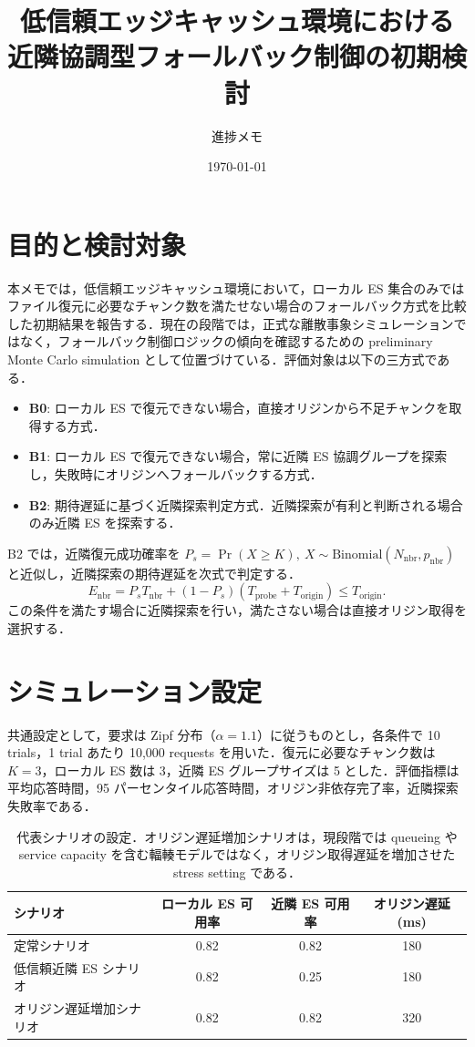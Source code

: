 \documentclass[paper=a4,fontsize=9pt]{jlreq}
\title{\vspace{-1.4em}低信頼エッジキャッシュ環境における\\近隣協調型フォールバック制御の初期検討}
\author{進捗メモ}
\date{\today}
\begin{document}
\maketitle
\vspace{-2.5em}

\section{目的と検討対象}
本メモでは，低信頼エッジキャッシュ環境において，ローカル ES 集合のみではファイル復元に必要なチャンク数を満たせない場合のフォールバック方式を比較した初期結果を報告する．現在の段階では，正式な離散事象シミュレーションではなく，フォールバック制御ロジックの傾向を確認するための preliminary Monte Carlo simulation として位置づけている．評価対象は以下の三方式である．

\begin{itemize}
  \item \textbf{B0}: ローカル ES で復元できない場合，直接オリジンから不足チャンクを取得する方式．
  \item \textbf{B1}: ローカル ES で復元できない場合，常に近隣 ES 協調グループを探索し，失敗時にオリジンへフォールバックする方式．
  \item \textbf{B2}: 期待遅延に基づく近隣探索判定方式．近隣探索が有利と判断される場合のみ近隣 ES を探索する．
\end{itemize}

B2 では，近隣復元成功確率を $P_s=\Pr(X\ge K),\ X\sim\mathrm{Binomial}(N_{\mathrm{nbr}},p_{\mathrm{nbr}})$ と近似し，近隣探索の期待遅延を次式で判定する．
\[
E_{\mathrm{nbr}}
=P_sT_{\mathrm{nbr}}+(1-P_s)(T_{\mathrm{probe}}+T_{\mathrm{origin}})
\le T_{\mathrm{origin}} .
\]
この条件を満たす場合に近隣探索を行い，満たさない場合は直接オリジン取得を選択する．

\section{シミュレーション設定}
共通設定として，要求は Zipf 分布（$\alpha=1.1$）に従うものとし，各条件で 10 trials，1 trial あたり 10,000 requests を用いた．復元に必要なチャンク数は $K=3$，ローカル ES 数は 3，近隣 ES グループサイズは 5 とした．評価指標は平均応答時間，95 パーセンタイル応答時間，オリジン非依存完了率，近隣探索失敗率である．

\begin{table}[h]
\centering
\caption{代表シナリオの設定．オリジン遅延増加シナリオは，現段階では queueing や service capacity を含む輻輳モデルではなく，オリジン取得遅延を増加させた stress setting である．}
\small
\begin{tabular}{lccc}
\toprule
シナリオ & ローカル ES 可用率 & 近隣 ES 可用率 & オリジン遅延 (ms) \\
\midrule
定常シナリオ & 0.82 & 0.82 & 180 \\
低信頼近隣 ES シナリオ & 0.82 & 0.25 & 180 \\
オリジン遅延増加シナリオ & 0.82 & 0.82 & 320 \\
\bottomrule
\end{tabular}
\end{table}
\end{document}
